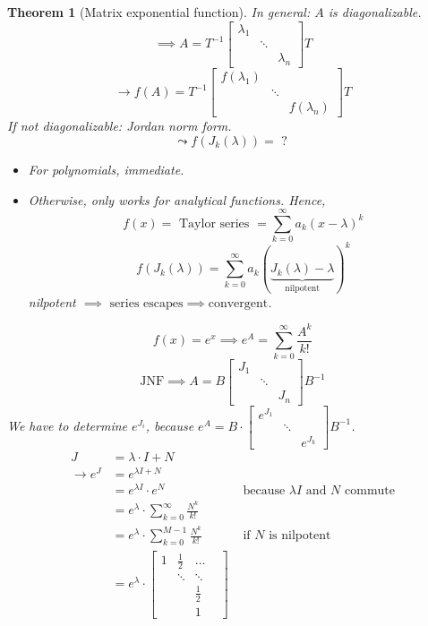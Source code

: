 \documentclass{article}
\newtheorem{theorem}{Theorem}  \numberwithin{theorem}{section}
\begin{document}
\begin{theorem}[Matrix exponential function] %
  In general: $A$ is diagonalizable.
  \[ \implies A = T^{-1} \begin{bmatrix} \lambda_1 & & \\ & \ddots & \\ & & \lambda_n \end{bmatrix} T \]
  \[ \to f(A) = T^{-1} \begin{bmatrix} f(\lambda_1) & & \\ & \ddots & \\ & & f(\lambda_n) \end{bmatrix} T \]
  If not diagonalizable: Jordan norm form.
  \[ \leadsto f(J_k(\lambda)) = \text{ ? } \]
  \begin{itemize}
    \item For polynomials, immediate.
    \item Otherwise, only works for analytical functions. Hence,
      \[ f(x) = \text{ Taylor series } = \sum_{k=0}^\infty a_k (x - \lambda)^k \]
      \[ f(J_k(\lambda)) = \sum_{k=0}^\infty a_k (\underbrace{J_k(\lambda) - \lambda}_{\text{nilpotent}})^k \]
      nilpotent $\implies \text{ series escapes} \implies \text{convergent}$.
  \end{itemize}

  \[ f(x) = e^x \implies e^A = \sum_{k=0}^\infty \frac{A^k}{k!} \]
  \[ \text{JNF} \implies A = B \begin{bmatrix} J_1 & & \\ & \ddots & \\ & & J_n \end{bmatrix} B^{-1} \]
  We have to determine $e^{J_i}$, because $e^A = B \cdot \begin{bmatrix} e^{J_1} & & \\ & \ddots & \\ & & e^{J_k} \end{bmatrix} B^{-1}$.
  \begin{align*}
    J &= \lambda \cdot I + N \\
    \to e^{J} &= e^{\lambda I + N} \\
      &= e^{\lambda I} \cdot e^N & \text{ because } \lambda I \text{ and } N \text{ commute} \\
      &= e^{\lambda} \cdot \sum_{k=0}^\infty \frac{N^k}{k!} \\
      &= e^{\lambda} \cdot \sum_{k=0}^{M-1} \frac{N^k}{k!} & \text{ if $N$ is nilpotent} \\
      &= e^{\lambda} \cdot \begin{bmatrix} 1 & \frac12 & \dots & \\ & \ddots & \ddots & \\ & & \frac12 & \\ & & 1 & \end{bmatrix}
  \end{align*}
\end{theorem}
\end{document}
